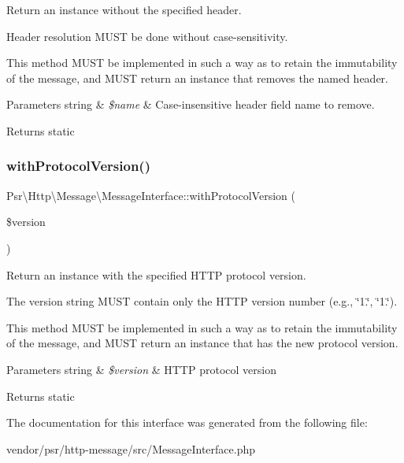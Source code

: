 Return an instance without the specified header.

Header resolution M\+U\+ST be done without case-\/sensitivity.

This method M\+U\+ST be implemented in such a way as to retain the immutability of the message, and M\+U\+ST return an instance that removes the named header.


\begin{DoxyParams}[1]{Parameters}
string & {\em \$name} & Case-\/insensitive header field name to remove. \\
\hline
\end{DoxyParams}
\begin{DoxyReturn}{Returns}
static 
\end{DoxyReturn}
\mbox{\label{interfacePsr_1_1Http_1_1Message_1_1MessageInterface_a63bd49651348e467eb17abce422f325e}} 
\subsubsection{\texorpdfstring{with\+Protocol\+Version()}{withProtocolVersion()}}
{\footnotesize\ttfamily Psr\textbackslash{}\+Http\textbackslash{}\+Message\textbackslash{}\+Message\+Interface\+::with\+Protocol\+Version (\begin{DoxyParamCaption}\item[{}]{\$version }\end{DoxyParamCaption})}

Return an instance with the specified H\+T\+TP protocol version.

The version string M\+U\+ST contain only the H\+T\+TP version number (e.\+g., \char`\"{}1.\char`\"{}, \char`\"{}1.\char`\"{}).

This method M\+U\+ST be implemented in such a way as to retain the immutability of the message, and M\+U\+ST return an instance that has the new protocol version.


\begin{DoxyParams}[1]{Parameters}
string & {\em \$version} & H\+T\+TP protocol version \\
\hline
\end{DoxyParams}
\begin{DoxyReturn}{Returns}
static 
\end{DoxyReturn}


The documentation for this interface was generated from the following file\+:\begin{DoxyCompactItemize}
\item 
vendor/psr/http-\/message/src/Message\+Interface.\+php\end{DoxyCompactItemize}
